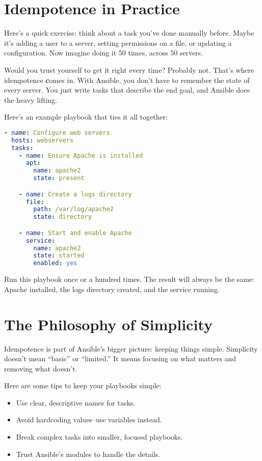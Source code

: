 \section{Idempotence in Practice}

Here's a quick exercise: think about a task you've done manually before. Maybe it's adding a user to a server, setting permissions on a file, or updating a configuration. Now imagine doing it 50 times, across 50 servers.

Would you trust yourself to get it right every time? Probably not. That's where idempotence \textbf{c}omes in. With Ansible, you don't have to remember the state of every server. You just write tasks that describe the end goal, and Ansible does the heavy lifting.

Here's an example playbook that ties it all together:
\begin{lstlisting}[language=yaml, caption=Idempotence in Action]
- name: Configure web servers
  hosts: webservers
  tasks:
    - name: Ensure Apache is installed
      apt:
        name: apache2
        state: present

    - name: Create a logs directory
      file:
        path: /var/log/apache2
        state: directory

    - name: Start and enable Apache
      service:
        name: apache2
        state: started
        enabled: yes
\end{lstlisting}

Run this playbook once or a hundred times. The result will always be the same: Apache installed, the logs directory created, and the service running.

\section{The Philosophy of Simplicity}

Idempotence is part of Ansible's bigger picture: keeping things simple. Simplicity doesn't mean “basic” or “limited.” It means focusing on what matters and removing what doesn't.

Here are some tips to keep your playbooks simple:
\begin{itemize}
    \item Use clear, descriptive names for tasks.
    \item Avoid hardcoding values--use variables instead.
    \item Break complex tasks into smaller, focused playbooks.
    \item Trust Ansible's modules to handle the details.
\end{itemize}

